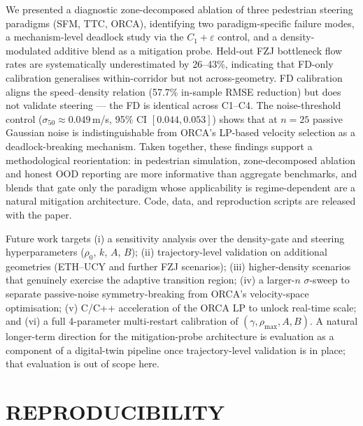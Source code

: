 \documentclass[a4paper,twoside]{article}
\begin{document}
We presented a diagnostic zone-decomposed ablation of three pedestrian steering paradigms (SFM, TTC, ORCA), identifying two paradigm-specific failure modes, a mechanism-level deadlock study via the $C_1{+}\varepsilon$ control, and a density-modulated additive blend as a mitigation probe. Held-out FZJ bottleneck flow rates are systematically underestimated by 26--43\%, indicating that FD-only calibration generalises within-corridor but not across-geometry. FD calibration aligns the speed--density relation (57.7\% in-sample RMSE reduction) but does not validate steering --- the FD is identical across C1--C4. The noise-threshold control ($\sigma_{50}\!\approx\!0.049$\,m/s, 95\% CI $[0.044,0.053]$) shows that at $n=25$ passive Gaussian noise is indistinguishable from ORCA's LP-based velocity selection as a deadlock-breaking mechanism. Taken together, these findings support a methodological reorientation: in pedestrian simulation, zone-decomposed ablation and honest OOD reporting are more informative than aggregate benchmarks, and blends that gate only the paradigm whose applicability is regime-dependent are a natural mitigation architecture. Code, data, and reproduction scripts are released with the paper.

Future work targets (i) a sensitivity analysis over the density-gate and steering hyperparameters ($\rho_0$, $k$, $A$, $B$); (ii) trajectory-level validation on additional geometries (ETH--UCY and further FZJ scenarios); (iii) higher-density scenarios that genuinely exercise the adaptive transition region; (iv) a larger-$n$ $\sigma$-sweep to separate passive-noise symmetry-breaking from ORCA's velocity-space optimisation; (v) C/C++ acceleration of the ORCA LP to unlock real-time scale; and (vi) a full 4-parameter multi-restart calibration of $(\gamma, \rho_{\max}, A, B)$. A natural longer-term direction for the mitigation-probe architecture is evaluation as a component of a digital-twin pipeline once trajectory-level validation is in place; that evaluation is out of scope here.



{\small
}

\appendix

\section{\uppercase{Reproducibility}}
\label{sec:appendix}
\end{document}
